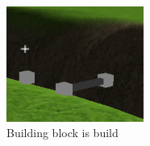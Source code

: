 \begin{figure}[H]
    \centering
    \includegraphics[width=0.4\textwidth]{screenshots/Builded.png}
    \caption{Building block is build}
    \label{fig:builded}
\end{figure}